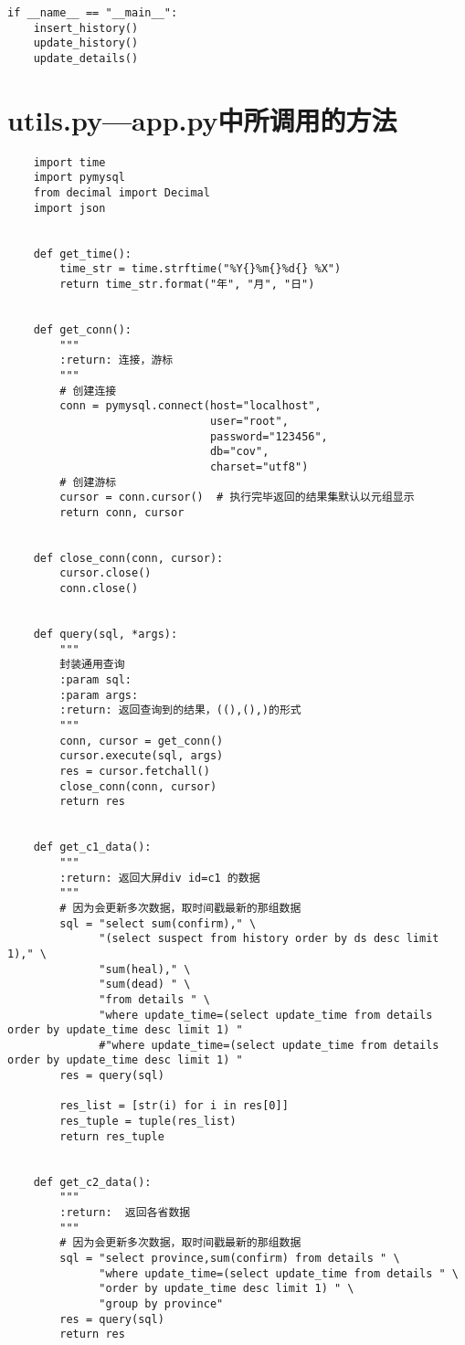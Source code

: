 \begin{lstlisting}
if __name__ == "__main__":
    insert_history()
    update_history()
    update_details()
\end{lstlisting}

\section{utils.py---app.py中所调用的方法}

\begin{lstlisting}
    import time
    import pymysql
    from decimal import Decimal
    import json
    
    
    def get_time():
        time_str = time.strftime("%Y{}%m{}%d{} %X")
        return time_str.format("年", "月", "日")
    
    
    def get_conn():
        """
        :return: 连接，游标
        """
        # 创建连接
        conn = pymysql.connect(host="localhost",
                               user="root",
                               password="123456",
                               db="cov",
                               charset="utf8")
        # 创建游标
        cursor = conn.cursor()  # 执行完毕返回的结果集默认以元组显示
        return conn, cursor
    
    
    def close_conn(conn, cursor):
        cursor.close()
        conn.close()
    
    
    def query(sql, *args):
        """
        封装通用查询
        :param sql:
        :param args:
        :return: 返回查询到的结果，((),(),)的形式
        """
        conn, cursor = get_conn()
        cursor.execute(sql, args)
        res = cursor.fetchall()
        close_conn(conn, cursor)
        return res
    
    
    def get_c1_data():
        """
        :return: 返回大屏div id=c1 的数据
        """
        # 因为会更新多次数据，取时间戳最新的那组数据
        sql = "select sum(confirm)," \
              "(select suspect from history order by ds desc limit 1)," \
              "sum(heal)," \
              "sum(dead) " \
              "from details " \
              "where update_time=(select update_time from details order by update_time desc limit 1) "
              #"where update_time=(select update_time from details order by update_time desc limit 1) "
        res = query(sql)
    
        res_list = [str(i) for i in res[0]]
        res_tuple = tuple(res_list)
        return res_tuple
    
    
    def get_c2_data():
        """
        :return:  返回各省数据
        """
        # 因为会更新多次数据，取时间戳最新的那组数据
        sql = "select province,sum(confirm) from details " \
              "where update_time=(select update_time from details " \
              "order by update_time desc limit 1) " \
              "group by province"
        res = query(sql)
        return res
    

\end{lstlisting}
